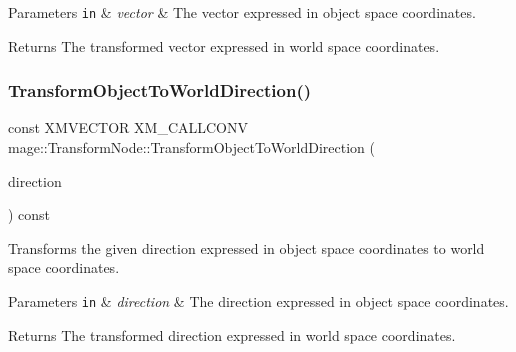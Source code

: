 \begin{DoxyParams}[1]{Parameters}
\mbox{\tt in}  & {\em vector} & The vector expressed in object space coordinates. \\
\hline
\end{DoxyParams}
\begin{DoxyReturn}{Returns}
The transformed vector expressed in world space coordinates. 
\end{DoxyReturn}
\hypertarget{structmage_1_1_transform_node_aacbb3c43db6a7b67170654e1ffc70892}{}\label{structmage_1_1_transform_node_aacbb3c43db6a7b67170654e1ffc70892} 
\subsubsection{\texorpdfstring{Transform\+Object\+To\+World\+Direction()}{TransformObjectToWorldDirection()}}
{\footnotesize\ttfamily const X\+M\+V\+E\+C\+T\+OR X\+M\+\_\+\+C\+A\+L\+L\+C\+O\+NV mage\+::\+Transform\+Node\+::\+Transform\+Object\+To\+World\+Direction (\begin{DoxyParamCaption}\item[{F\+X\+M\+V\+E\+C\+T\+OR}]{direction }\end{DoxyParamCaption}) const\hspace{0.3cm}{\ttfamily [noexcept]}}

Transforms the given direction expressed in object space coordinates to world space coordinates.


\begin{DoxyParams}[1]{Parameters}
\mbox{\tt in}  & {\em direction} & The direction expressed in object space coordinates. \\
\hline
\end{DoxyParams}
\begin{DoxyReturn}{Returns}
The transformed direction expressed in world space coordinates. 
\end{DoxyReturn}
\hypertarget{structmage_1_1_transform_node_a0cd8cd0683c141f2632d96bb3c155614}{}\label{structmage_1_1_transform_node_a0cd8cd0683c141f2632d96bb3c155614} 
